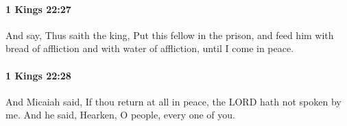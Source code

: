 		\paragraph{1 Kings 22:27} %
			\label{1KINGS-22-27}

			And say, Thus saith the king, Put this fellow in the prison, and feed him with bread of affliction and with water of affliction, until I come in peace.


		\paragraph{1 Kings 22:28} %
			\label{1KINGS-22-28}

			And Micaiah said, If thou return at all in peace, the LORD hath not spoken by me. And he said, Hearken, O people, every one of you.


